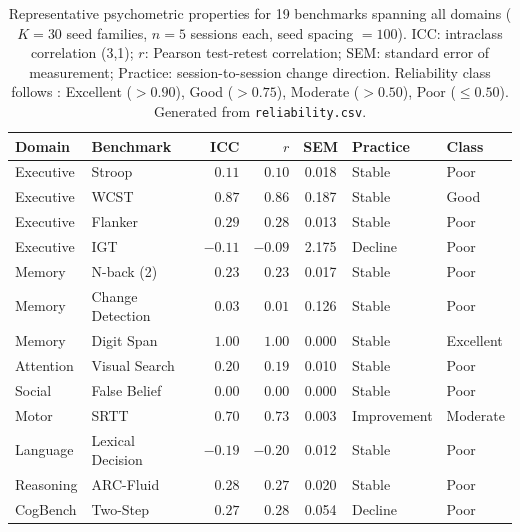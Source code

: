 \documentclass[11pt,letterpaper]{article}
\begin{document}
\begin{table}[t]
\centering
\caption{Representative psychometric properties for 19 benchmarks spanning all domains ($K = 30$ seed families, $n = 5$ sessions each, seed spacing $= 100$). ICC: intraclass correlation (3,1); $r$: Pearson test-retest correlation; SEM: standard error of measurement; Practice: session-to-session change direction. Reliability class follows \citet{cicchetti1994guidelines}: Excellent ($> 0.90$), Good ($> 0.75$), Moderate ($> 0.50$), Poor ($\leq 0.50$). Generated from \texttt{reliability.csv}.}
\label{tab:psychometrics}
\small
\begin{tabular}{@{}llrrcll@{}}
\toprule
\textbf{Domain} & \textbf{Benchmark} & \textbf{ICC} & \textbf{$r$} & \textbf{SEM} & \textbf{Practice} & \textbf{Class} \\
\midrule
Executive     & Stroop             &  $0.11$ &  $0.10$ & 0.018 & Stable      & Poor \\
Executive     & WCST               &  $\mathbf{0.87}$ &  $\mathbf{0.86}$ & 0.187 & Stable      & Good \\
Executive     & Flanker            &  $0.29$ &  $0.28$ & 0.013 & Stable      & Poor \\
Executive     & IGT                & $-0.11$ & $-0.09$ & 2.175 & Decline     & Poor \\
Memory        & N-back (2)         &  $0.23$ &  $0.23$ & 0.017 & Stable      & Poor \\
Memory        & Change Detection   &  $0.03$ &  $0.01$ & 0.126 & Stable      & Poor \\
Memory        & Digit Span         &  $\mathbf{1.00}$ &  $\mathbf{1.00}$ & 0.000 & Stable      & Excellent \\
Attention     & Visual Search      &  $0.20$ &  $0.19$ & 0.010 & Stable      & Poor \\
Social        & False Belief       &  $0.00$ &  $0.00$ & 0.000 & Stable      & Poor \\
Motor         & SRTT               &  $\mathbf{0.70}$ &  $\mathbf{0.73}$ & 0.003 & Improvement & Moderate \\
Language      & Lexical Decision   & $-0.19$ & $-0.20$ & 0.012 & Stable      & Poor \\
Reasoning     & ARC-Fluid          &  $0.28$ &  $0.27$ & 0.020 & Stable      & Poor \\
CogBench      & Two-Step           &  $0.27$ &  $0.28$ & 0.054 & Decline     & Poor \\

\end{tabular}
\end{table}
\end{document}
